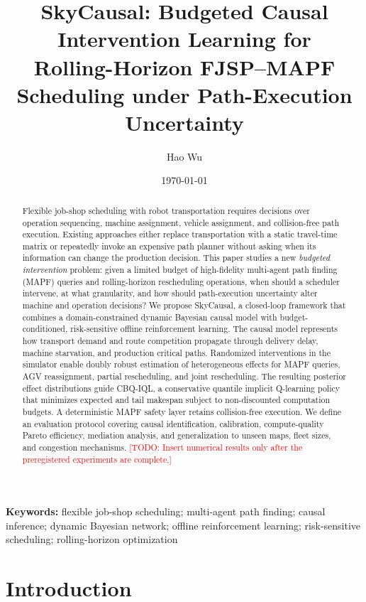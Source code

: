 \documentclass[11pt,a4paper]{article}
\title{\textbf{SkyCausal: Budgeted Causal Intervention Learning for\\
Rolling-Horizon FJSP--MAPF Scheduling under Path-Execution Uncertainty}}
\author{Hao Wu \and \todo{Co-authors}}
\date{\today}
\newcommand{\method}{SkyCausal}
\newcommand{\algo}{CBQ-IQL}
\newcommand{\todo}[1]{\textcolor{red}{[TODO: #1]}}
\begin{document}
\maketitle

\begin{abstract}
Flexible job-shop scheduling with robot transportation requires decisions over
operation sequencing, machine assignment, vehicle assignment, and
collision-free path execution. Existing approaches either replace transportation
with a static travel-time matrix or repeatedly invoke an expensive path planner
without asking when its information can change the production decision. This
paper studies a new \emph{budgeted intervention} problem: given a limited budget
of high-fidelity multi-agent path finding (MAPF) queries and rolling-horizon
rescheduling operations, when should a scheduler intervene, at what granularity,
and how should path-execution uncertainty alter machine and operation decisions?
We propose \method, a closed-loop framework that combines a
domain-constrained dynamic Bayesian causal model with budget-conditioned,
risk-sensitive offline reinforcement learning. The causal model represents how
transport demand and route competition propagate through delivery delay,
machine starvation, and production critical paths. Randomized interventions in
the simulator enable doubly robust estimation of heterogeneous effects for MAPF
queries, AGV reassignment, partial rescheduling, and joint rescheduling.
The resulting posterior effect distributions guide \algo, a conservative
quantile implicit Q-learning policy that minimizes expected and tail makespan
subject to non-discounted computation budgets. A deterministic MAPF safety layer
retains collision-free execution. We define an evaluation protocol covering
causal identification, calibration, compute-quality Pareto efficiency, mediation
analysis, and generalization to unseen maps, fleet sizes, and congestion
mechanisms. \todo{Insert numerical results only after the preregistered
experiments are complete.}
\end{abstract}

\noindent\textbf{Keywords:}
flexible job-shop scheduling; multi-agent path finding; causal inference;
dynamic Bayesian network; offline reinforcement learning; risk-sensitive
scheduling; rolling-horizon optimization

\section{Introduction}
\label{sec:introduction}
\end{document}
